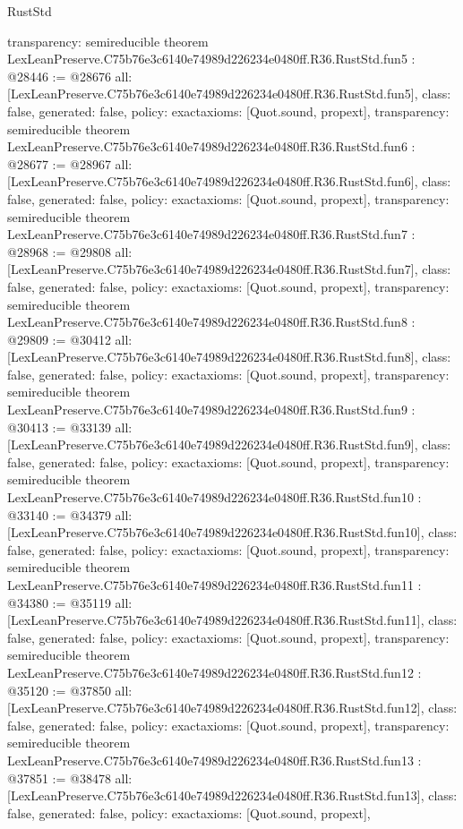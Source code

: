 \begin{lexlean}{RustStd}
\begin{coremodule}
{  transparency: semireducible
}
theorem LexLeanPreserve.C75b76e3c6140e74989d226234e0480ff.R36.RustStd.fun5 : @28446 := @28676 {
  all: [LexLeanPreserve.C75b76e3c6140e74989d226234e0480ff.R36.RustStd.fun5],
  class: false,
  generated: false,
  policy: exact{axioms: [Quot.sound, propext]},
  transparency: semireducible
}
theorem LexLeanPreserve.C75b76e3c6140e74989d226234e0480ff.R36.RustStd.fun6 : @28677 := @28967 {
  all: [LexLeanPreserve.C75b76e3c6140e74989d226234e0480ff.R36.RustStd.fun6],
  class: false,
  generated: false,
  policy: exact{axioms: [Quot.sound, propext]},
  transparency: semireducible
}
theorem LexLeanPreserve.C75b76e3c6140e74989d226234e0480ff.R36.RustStd.fun7 : @28968 := @29808 {
  all: [LexLeanPreserve.C75b76e3c6140e74989d226234e0480ff.R36.RustStd.fun7],
  class: false,
  generated: false,
  policy: exact{axioms: [Quot.sound, propext]},
  transparency: semireducible
}
theorem LexLeanPreserve.C75b76e3c6140e74989d226234e0480ff.R36.RustStd.fun8 : @29809 := @30412 {
  all: [LexLeanPreserve.C75b76e3c6140e74989d226234e0480ff.R36.RustStd.fun8],
  class: false,
  generated: false,
  policy: exact{axioms: [Quot.sound, propext]},
  transparency: semireducible
}
theorem LexLeanPreserve.C75b76e3c6140e74989d226234e0480ff.R36.RustStd.fun9 : @30413 := @33139 {
  all: [LexLeanPreserve.C75b76e3c6140e74989d226234e0480ff.R36.RustStd.fun9],
  class: false,
  generated: false,
  policy: exact{axioms: [Quot.sound, propext]},
  transparency: semireducible
}
theorem LexLeanPreserve.C75b76e3c6140e74989d226234e0480ff.R36.RustStd.fun10 : @33140 := @34379 {
  all: [LexLeanPreserve.C75b76e3c6140e74989d226234e0480ff.R36.RustStd.fun10],
  class: false,
  generated: false,
  policy: exact{axioms: [Quot.sound, propext]},
  transparency: semireducible
}
theorem LexLeanPreserve.C75b76e3c6140e74989d226234e0480ff.R36.RustStd.fun11 : @34380 := @35119 {
  all: [LexLeanPreserve.C75b76e3c6140e74989d226234e0480ff.R36.RustStd.fun11],
  class: false,
  generated: false,
  policy: exact{axioms: [Quot.sound, propext]},
  transparency: semireducible
}
theorem LexLeanPreserve.C75b76e3c6140e74989d226234e0480ff.R36.RustStd.fun12 : @35120 := @37850 {
  all: [LexLeanPreserve.C75b76e3c6140e74989d226234e0480ff.R36.RustStd.fun12],
  class: false,
  generated: false,
  policy: exact{axioms: [Quot.sound, propext]},
  transparency: semireducible
}
theorem LexLeanPreserve.C75b76e3c6140e74989d226234e0480ff.R36.RustStd.fun13 : @37851 := @38478 {
  all: [LexLeanPreserve.C75b76e3c6140e74989d226234e0480ff.R36.RustStd.fun13],
  class: false,
  generated: false,
  policy: exact{axioms: [Quot.sound, propext]},
}
\end{coremodule}
\end{lexlean}
